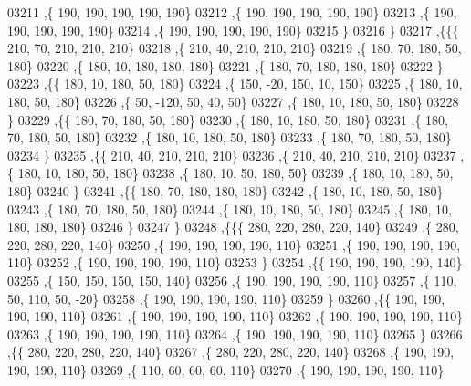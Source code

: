 \begin{DoxyCode}
03211     ,\{   190,   190,   190,   190,   190\}
03212     ,\{   190,   190,   190,   190,   190\}
03213     ,\{   190,   190,   190,   190,   190\}
03214     ,\{   190,   190,   190,   190,   190\}
03215     \}
03216    \}
03217   ,\{\{\{   210,    70,   210,   210,   210\}
03218     ,\{   210,    40,   210,   210,   210\}
03219     ,\{   180,    70,   180,    50,   180\}
03220     ,\{   180,    10,   180,   180,   180\}
03221     ,\{   180,    70,   180,   180,   180\}
03222     \}
03223    ,\{\{   180,    10,   180,    50,   180\}
03224     ,\{   150,   -20,   150,    10,   150\}
03225     ,\{   180,    10,   180,    50,   180\}
03226     ,\{    50,  -120,    50,    40,    50\}
03227     ,\{   180,    10,   180,    50,   180\}
03228     \}
03229    ,\{\{   180,    70,   180,    50,   180\}
03230     ,\{   180,    10,   180,    50,   180\}
03231     ,\{   180,    70,   180,    50,   180\}
03232     ,\{   180,    10,   180,    50,   180\}
03233     ,\{   180,    70,   180,    50,   180\}
03234     \}
03235    ,\{\{   210,    40,   210,   210,   210\}
03236     ,\{   210,    40,   210,   210,   210\}
03237     ,\{   180,    10,   180,    50,   180\}
03238     ,\{   180,    10,    50,   180,    50\}
03239     ,\{   180,    10,   180,    50,   180\}
03240     \}
03241    ,\{\{   180,    70,   180,   180,   180\}
03242     ,\{   180,    10,   180,    50,   180\}
03243     ,\{   180,    70,   180,    50,   180\}
03244     ,\{   180,    10,   180,    50,   180\}
03245     ,\{   180,    10,   180,   180,   180\}
03246     \}
03247    \}
03248   ,\{\{\{   280,   220,   280,   220,   140\}
03249     ,\{   280,   220,   280,   220,   140\}
03250     ,\{   190,   190,   190,   190,   110\}
03251     ,\{   190,   190,   190,   190,   110\}
03252     ,\{   190,   190,   190,   190,   110\}
03253     \}
03254    ,\{\{   190,   190,   190,   190,   140\}
03255     ,\{   150,   150,   150,   150,   140\}
03256     ,\{   190,   190,   190,   190,   110\}
03257     ,\{   110,    50,   110,    50,   -20\}
03258     ,\{   190,   190,   190,   190,   110\}
03259     \}
03260    ,\{\{   190,   190,   190,   190,   110\}
03261     ,\{   190,   190,   190,   190,   110\}
03262     ,\{   190,   190,   190,   190,   110\}
03263     ,\{   190,   190,   190,   190,   110\}
03264     ,\{   190,   190,   190,   190,   110\}
03265     \}
03266    ,\{\{   280,   220,   280,   220,   140\}
03267     ,\{   280,   220,   280,   220,   140\}
03268     ,\{   190,   190,   190,   190,   110\}
03269     ,\{   110,    60,    60,    60,   110\}
03270     ,\{   190,   190,   190,   190,   110\}

\end{DoxyCode}

